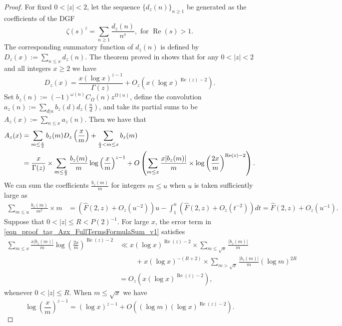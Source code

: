 \documentclass[11pt,reqno,a4letter]{article}
\numberwithin{figure}{section}
\numberwithin{table}{section}
\theoremstyle{plain}
\numberwithin{theorem}{section}
\theoremstyle{definition}
\renewcommand{\Re}{\operatorname{Re}}
\begin{document}
\begin{proof}
For fixed $0 < |z| < 2$, let the sequence $\{d_z(n)\}_{n \geq 1}$ be generated as the coefficients of the DGF 
$$\zeta(s)^{z} = \sum_{n \geq 1} \frac{d_z(n)}{n^s}, \text{ for } \Re(s) > 1.$$ The corresponding 
summatory function of $d_z(n)$ is defined by $D_z(x) := \sum\limits_{n \leq x} d_z(n)$. 
The theorem proved in 
\cite[Thm.\ 7.17; \S 7.4]{MV} shows that for any $0 < |z| < 2$ 
and all integers $x \geq 2$ we have 
\[
D_z(x) = \frac{x (\log x)^{z-1}}{\Gamma(z)} + O_z\left(x (\log x)^{\Re(z)-2}\right). 
\]
Set 
$b_z(n) := (-1)^{\omega(n)} C_{\Omega}(n) z^{\Omega(n)}$, define the convolution 
$a_z(n) := \sum\limits_{d|n} b_z(d) d_z\left(\frac{n}{d}\right)$, 
and take its partial sums to be  
$A_z(x) := \sum\limits_{n \leq x} a_z(n)$. 
Then we have that 
\begin{align} 
\notag 
A_z(x) & = \sum_{m \leq \frac{x}{2}} b_z(m) D_z\left(\frac{x}{m}\right) + 
     \sum_{\frac{x}{2} < m \leq x} b_z(m) \\ 
\label{eqn_proof_tag_Azx_FullTermsFormulaSum_v1} 
     & = \frac{x}{\Gamma(z)} \times \sum_{m \leq \frac{x}{2}} 
     \frac{b_z(m)}{m} \log\left(\frac{x}{m}\right)^{z-1} + 
     O\left(\sum_{m \leq x} \frac{x |b_z(m)|}{m} \times
     \log\left(\frac{2x}{m}\right)^{\Re(z) - 2}\right). 
\end{align} 
We can sum the coefficients $\frac{b_z(m)}{m}$ 
for integers $m \leq u$ when $u$ is taken sufficiently large as 
\begin{align*} 
\sum_{m \leq u} \frac{b_z(m)}{m^2} \times m & = \left(\widehat{F}(2, z) + 
     O_z\left(u^{-2}\right)\right) u - \int_1^{u} 
     \left(\widehat{F}(2, z) + O_z\left(t^{-2}\right)\right) dt 
     = \widehat{F}(2, z) + O_z\left(u^{-1}\right). 
\end{align*} 
Suppose that $0 < |z| \leq R < P(2)^{-1}$. 
For large $x$, the error term in \eqref{eqn_proof_tag_Azx_FullTermsFormulaSum_v1} satisfies 
\begin{align*} 
\sum_{m \leq x} \frac{x |b_z(m)|}{m} 
     \log\left(\frac{2x}{m}\right)^{\Re(z) - 2} & \ll 
     x (\log x)^{\Re(z) - 2} \times \sum_{m \leq \sqrt{x}} \frac{|b_z(m)|}{m} \\ 
     & \phantom{\ll x\ } + 
     x (\log x)^{-(R+2)} \times \sum_{m > \sqrt{x}} \frac{|b_z(m)|}{m} (\log m)^{2R} \\ 
     & = O_z\left(x (\log x)^{\Re(z) - 2}\right), 
\end{align*} 
whenever $0 < |z| \leq R$. 
When $m \leq \sqrt{x}$ we have 
\[
\log\left(\frac{x}{m}\right)^{z-1} = (\log x)^{z-1} + 
     O\left((\log m) (\log x)^{\Re(z) - 2}\right). 
\]
\end{proof}
\end{document}
